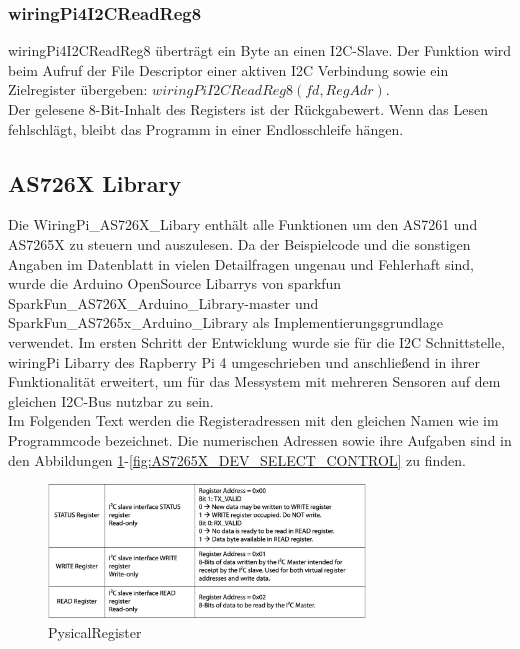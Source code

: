 \subsubsection{wiringPi4I2CReadReg8}
wiringPi4I2CReadReg8 überträgt ein Byte an einen I2C-Slave.
Der Funktion wird beim Aufruf der File Descriptor einer aktiven I2C Verbindung sowie ein Zielregister übergeben: $wiringPiI2CReadReg8(fd, RegAdr)$.\\
Der gelesene 8-Bit-Inhalt des Registers ist der Rückgabewert.
Wenn das Lesen fehlschlägt, bleibt das Programm in einer Endlosschleife hängen.

\subsection{AS726X Library}\label{AS726X-Library}
Die WiringPi\_AS726X\_Libary enthält alle Funktionen um den AS7261 und AS7265X zu steuern und auszulesen.
Da der Beispielcode und die sonstigen Angaben im Datenblatt in vielen Detailfragen ungenau und Fehlerhaft sind, wurde die Arduino OpenSource Libarrys von sparkfun SparkFun\_AS726X\_Arduino\_Library-master und SparkFun\_AS7265x\_Arduino\_Library als Implementierungsgrundlage verwendet.
Im ersten Schritt der Entwicklung wurde sie für die I2C Schnittstelle, wiringPi Libarry des Rapberry Pi 4 umgeschrieben und anschließend in ihrer Funktionalität erweitert, um für das Messystem mit mehreren Sensoren auf dem gleichen I2C-Bus nutzbar zu sein. \\

\noindent Im Folgenden Text werden die Registeradressen mit den gleichen Namen wie im Programmcode bezeichnet. Die numerischen Adressen sowie ihre Aufgaben sind in den Abbildungen \ref{fig:PysicalRegister}-\ref{fig:AS7265X_DEV_SELECT_CONTROL} zu finden.

\begin{figure}[H]
\centering
\includegraphics[width=0.75\textwidth]{img/PysicalRegister}
\caption{PysicalRegister\cite{Datenblatt_AS7261}}
\label{fig:PysicalRegister}
\end{figure}

